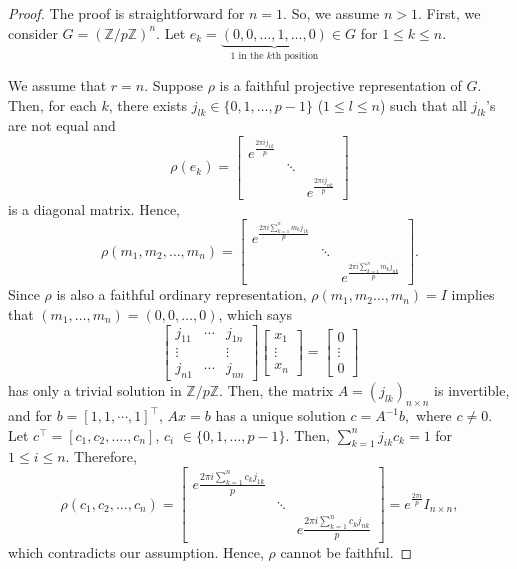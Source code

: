 \documentclass[10pt,a4paper]{amsart}
\newcommand{\Z}{\mathbb{Z}}
\begin{document}
\begin{proof}
	The proof is straightforward for $n=1$. So, we assume $n>1$. First, we consider $G=(\mathbb Z/p\mathbb Z)^n$. Let $e_{k}= \underbrace{(0,0, \ldots, 1, \ldots, 0)}_\text{$1$ in the $k{\text {th}}$ position} \in G$ for $1 \leq k \leq n$.
	
	We assume that $r=n$.  
	Suppose $\rho$ is a faithful projective representation of $G$. Then, for each $k$, there exists $j_{l k} \in \{0,1, \ldots, p-1\}$ ($1\leq l \leq n $) such that all $j_{l k}$'s are not equal and $$\rho(e_{k})=
	\left[\begin{array}{ccc}e^{\frac{2 \pi ij_{1k}}{p}} &  & \\
		& \ddots & \\
		& & e^{\frac{2 \pi ij_{nk}}{p}}\end{array}\right]$$
	is a diagonal matrix. Hence, $$\rho\left(m_{1}, m_{2}, \ldots, m_{n}\right)
	=\left[\begin{array}{ccc}e^{\frac{2 \pi i \sum\limits_{k=1}^{n} m_{k} j_{1 k}}{p}} &  & \\
		& \ddots & \\
		& & e^{\frac{2 \pi i \sum \limits_{k=1}^{n} m_{k} j_{n k}}{p}}\end{array}\right].$$                                            
	Since $\rho$ is also a faithful ordinary representation, $\rho\left(m_{1}, m_{2} \ldots, m_{n}\right)= I$ implies that $\left(m_{1}, \ldots, m_{n}\right)= (0,0, \ldots, 0)$, which says
	$$
	\left[\begin{array}{ccc}
		j_{11} & \cdots & j_{1 n} \\
		\vdots & &\vdots \\
		j_{n 1} & \cdots & j_{n n}
	\end{array}\right]\left[\begin{array}{c}
		x_{1} \\
		\vdots \\
		{x}_{n}
	\end{array}\right]= \left[\begin{array}{c}
		0 \\
		\vdots \\
		0
	\end{array}\right]
	$$
	has only a trivial solution in $\Z/p\Z$. Then, the matrix $A=(j_{lk})_{n\times n}$ is invertible,
	and for $b=[1,1,\cdots, 1]^{\top}$, $A x=b$ has a unique solution $c=A^{-1} b,$ where $c \neq 0$.
	Let $c^{\top}= \left[c_{1}, c_{2}, \ldots ., c_{n}\right]$, 
	$c_{i}$ $\in \{0,1, \ldots, p-1\}$.
	Then, $\sum\limits_{k=1}^{n} j_{i k} c_{k}= 1$ for $1\leq i \leq n$. Therefore, 
	\[\rho\left(c_{1}, c_{2}, \ldots, c_{n}\right)=
	\left[\begin{array}{ccc}
		e\frac{2 \pi i \sum\limits_{k=1}^n c_k j_{1k}}{p} & & \\
		& \ddots & \\
		&  & e \frac{2 \pi i \sum\limits_{k=1}^n c_k j_{nk}}{p} 
	\end{array}\right]
	= e^{\frac{2 \pi i}{p}} I_{n \times n},
	\] which contradicts our assumption. Hence, $\rho$ cannot be faithful. 
	

\end{proof}
\end{document}
